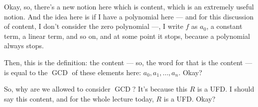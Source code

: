 \begin{speech}[00:01:51 - 00:02:55]
Okay, so, there's a new notion here which is content, which is an extremely useful notion.  And the idea here is if I have a polynomial here --- and for this discussion of content, I don't consider the zero polynomial  ---, I write $f$ as $a_0$, a constant term, a linear term, and so on, and at some point it stops, because a polynomial always stops. 

Then, this is the definition: the content --- so, the word for that is the content --- is equal to the $\operatorname{GCD}$ of these elements here: $a_0, a_1, \dots, a_n$.  Okay?

So, why are we allowed to consider $\operatorname{GCD}$? It's because this $R$ is a UFD. I should say this content, and for the whole lecture today, $R$ is a UFD.  Okay?
\end{speech}

\begin{content}
\end{content}

